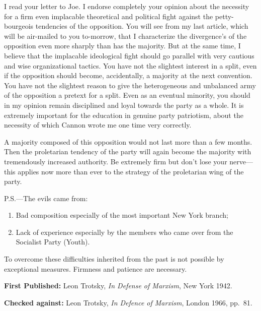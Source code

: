 \label{1939-12-18_a-letter-to-john-g-wright}


I read your letter to Joe. I endorse completely your opinion about the necessity for a firm even implacable theoretical and political fight against the petty-bourgeois tendencies of the opposition. You will see from my last article, which will be air-mailed to you to-morrow, that I characterize the divergence’s of the opposition even more sharply than has the majority. But at the same time, I believe that the implacable ideological fight should go parallel with very cautious and wise organizational tactics. You have not the slightest interest in a split, even if the opposition should become, accidentally, a majority at the next convention. You have not the slightest reason to give the heterogeneous and unbalanced army of the opposition a pretext for a split. Even as an eventual minority, you should in my opinion remain disciplined and loyal towards the party as a whole. It is extremely important for the education in genuine party patriotism, about the necessity of which Cannon wrote me one time very correctly.

A majority composed of this opposition would not last more than a few months. Then the proletarian tendency of the party will again become the majority with tremendously increased authority. Be extremely firm but don’t lose your nerve---this applies now more than ever to the strategy of the proletarian wing of the party.


\begin{postscriptum}
  P.S.---The evils came from:
  \begin{enumerate}
    \item Bad composition especially of the most important New York branch;
    \item Lack of experience especially by the members who came over from the Socialist Party (Youth).
  \end{enumerate}
  To overcome these difficulties inherited from the past is not possible by exceptional measures. Firmness and patience are necessary.
\end{postscriptum}

\begin{letterinfo}
	\textbf{First Published:} Leon Trotsky, \emph{In Defense of Marxism}, New York 1942.
	
	\textbf{Checked against:} Leon Trotsky, \emph{In Defence of Marxism}, London 1966, pp.~81.
\end{letterinfo}